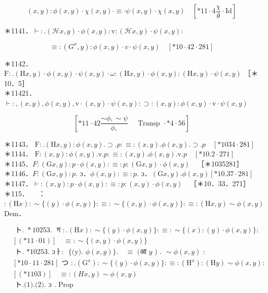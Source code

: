 \documentclass[10pt]{article}
\begin{document}
$$
(x, y): \phi(x, y) \cdot \chi(x, y) \cdot \equiv \cdot \psi(x, y) \cdot \chi(x, y) \quad\left[* 11 \cdot 4 \frac{\chi}{\theta} \cdot \mathrm{Id}\right]
$$

＊1141．$\vdash: .(\mathcal{H} x, y) \cdot \phi(x, y): \mathrm{v}:(\mathcal{H} x, y) \cdot \psi(x, y):$

$$
\equiv:\left(G^{x}, y\right): \phi(x, y) \cdot v \cdot \psi(x, y) \quad[* 10 \cdot 42 \cdot 281]
$$

＊1142． $\mathrm{F}: .(\mathrm{H} x, y) \cdot \phi(x, y) \cdot \psi(x, y) \cdot \omega:(\mathrm{H} x, y) \cdot \phi(x, y):(\mathrm{H} x, y) \cdot \psi(x, y)$ ［＊10．5］\\
＊11421．$\vdash:,(x, y), \phi(x, y), \mathrm{v} \cdot(x, y) \cdot \psi(x, y): \supset:(x, y): \phi(x, y) \cdot \mathrm{v} \cdot \psi(x, y)$

$$
\left[* 11 \cdot 42 \frac{\sim \phi, \sim \psi}{\phi,} \quad \text { Transp } \cdot * 4 \cdot 56\right]
$$

＊1143． $\mathrm{F}: .(\mathrm{H} x, y): \phi(x, y) . \supset . p: \equiv:(x, y) . \phi(x, y) . \supset . p \quad[* 1034 \cdot 281]$\\
＊1144． $\mathrm{F}:(x, y): \phi(x, y) . \mathrm{v} . p: \equiv:(x, y) . \phi(x, y) . \mathrm{v} . p \quad[* 10.2 \cdot 271]$\\
＊1145．$F:(\mathrm{G} x, y): p \cdot \phi(x, y): \equiv: p:(\mathrm{G} x, y) \cdot \phi(x, y) \quad$［＊1035281］\\
＊1146．$F:(\mathrm{G} x, y): p$. ɔ．$\phi(x, y): \equiv: p$. ɔ．$(\mathrm{G} x, y) . \phi(x, y)[* 10.37 \cdot 281]$\\
＊1147．$\vdash:(x, y): p \cdot \phi(x, y): \equiv: p:(x, y) \cdot \phi(x, y) \quad$［＊10．33．271］\\
＊115．$\quad$ ：$:(\mathrm{H} x): \sim\{(y) \cdot \phi(x, y)\}: \equiv: \sim\{(x, y) \cdot \phi(x, y)\}: \equiv:(\mathrm{H} x, y) \sim \phi(x, y)$\\
Dem．


\begin{align*}
& \text { ト. } * 10253 \text {. } \text { ग }: .(\mathrm{H} x): \sim\{(y) \cdot \phi(x, y)\}: \equiv: \sim\{(x):(y) \cdot \phi(x, y)\}: \\
& {[(* 11 \cdot 01)] \quad \equiv: \sim\{(x, y) \cdot \phi(x, y)\}}  \tag{1}\\
& \text { ト. *10253. ɔㅏ: ~\{(y). } \phi(x, y)\} . \quad \equiv \text { (आ } y \text { ) . } \sim \phi(x, y) \text { : } \\
& {[* 10 \cdot 11 \cdot 281] \text { つ }: .\left(\mathrm{G}^{x}\right): \sim\{(y) \cdot \phi(x, y)\}: \equiv:\left(\mathrm{H}^{x}\right):(\mathrm{H} y) \sim \phi(x, y):} \\
& {[(* 1103)] \quad \equiv:(H x, y) \sim \phi(x, y)}  \tag{2}\\
& \text { ト.(1).(2). ɔ } . \text { Prop }
\end{align*}
\end{document}
